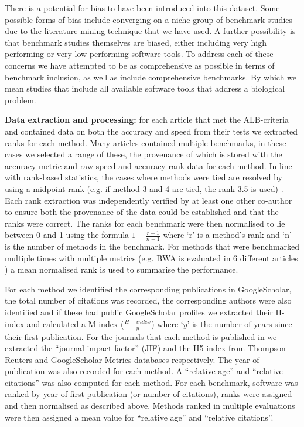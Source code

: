 \documentclass[fleqn,10pt]{SelfArx} %
\begin{document}
There is a potential for bias to have been introduced into this dataset. Some possible forms of bias include converging on a niche group of benchmark studies due to the literature mining technique that we have used. A further possibility is that benchmark studies themselves are biased, either including very high performing or very low performing software tools. To address each of these concerns we have attempted to be as comprehensive as possible in terms of benchmark inclusion, as well as include comprehensive benchmarks. By which we mean studies that include all available software tools that address a biological problem. 

\textbf{Data extraction and processing:} for each article that met the ALB-criteria and contained data on both the accuracy and speed from their tests we extracted ranks for each method. Many articles contained multiple benchmarks, in these cases we selected a range of these, the provenance of which is stored with the accuracy metric and raw speed and accuracy rank data for each method. In line with rank-based statistics, the cases where methods were tied are resolved by using a midpoint rank (e.g. if method 3 and 4 are tied, the rank 3.5 is used) \cite{Mann1947-re}. Each rank extraction was independently verified by at least one other co-author to ensure both the provenance of the data could be established and that the ranks were correct. The ranks for each benchmark were then normalised to lie between 0 and 1 using the formula $1-\frac{r-1}{n-1}$ where ‘r’ is a method’s rank and ‘n’ is the number of methods in the benchmark. For methods that were benchmarked multiple times with multiple metrics (e.g. BWA is evaluated in 6 different articles \cite{Bao2011-lv,Caboche2014-lj,Hatem2013-cs,Schbath2012-ob,Ruffalo2011-rl,Holtgrewe2011-fd}) a mean normalised rank is used to summarise the performance.
 
For each method we identified the corresponding publications in GoogleScholar, the total number of citations was recorded, the corresponding authors were also identified and if these had public GoogleScholar profiles we extracted their H-index and calculated a M-index ($\frac{H-index}{y}$) where ‘$y$’ is the number of years since their first publication. For the journals that each method is published in we extracted the “journal impact factor” (JIF) and the H5-index from Thompson-Reuters and GoogleScholar Metrics databases respectively. The year of publication was also recorded for each method. A “relative age” and “relative citations” was also computed for each method. For each benchmark, software was ranked by year of first publication (or number of citations), ranks were assigned and then normalised as described above. Methods ranked in multiple evaluations were then assigned a mean value for “relative age” and “relative citations”. 
\end{document}

